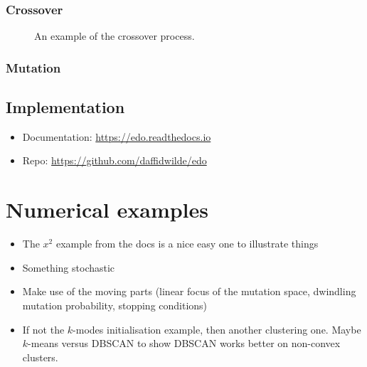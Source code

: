 \documentclass[10pt]{article}
\newlength{\imgwidth}
\newcommand{\inputtikz}[3][\imgwidth]{%
    \begin{figure}[htbp]
        \centering
        \resizebox{#1}{!}{%
            
        }
        \caption{#3}
    \end{figure}
}
\begin{document}
\subsubsection{Crossover}

\inputtikz{tex/crossover.tex}{An example of the crossover process.}

\subsubsection{Mutation}

\subsection{Implementation}\label{subsection:implementation}

\begin{itemize}
    \item Documentation: \url{https://edo.readthedocs.io}
    \item Repo: \url{https://github.com/daffidwilde/edo}
\end{itemize}


\section{Numerical examples}\label{section:examples}

\begin{itemize}
    \item The \(x^2\) example from the docs is a nice easy one to illustrate
        things
    \item Something stochastic
    \item Make use of the moving parts (linear focus of the mutation space,
        dwindling mutation probability, stopping conditions)
    \item If not the \(k\)-modes initialisation example, then another clustering
        one. Maybe \(k\)-means versus DBSCAN to show DBSCAN works better on
        non-convex clusters.
\end{itemize}
\end{document}
